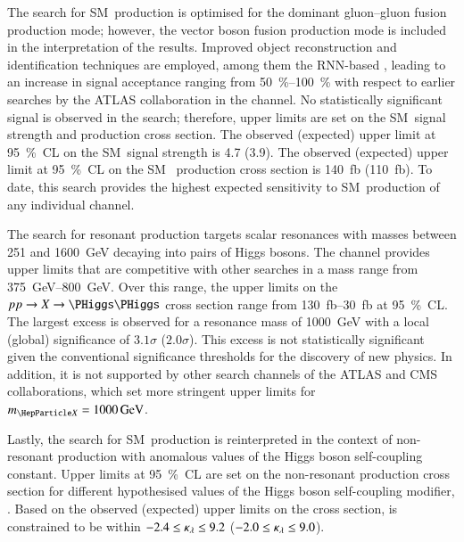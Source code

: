 The search for SM~\HH production is optimised for the dominant gluon--gluon
fusion production mode; however, the vector boson fusion production mode is
included in the interpretation of the results. Improved object reconstruction
and identification techniques are employed, among them the RNN-based \tauid,
leading to an increase in signal acceptance ranging from
\SIrange[range-units=repeat]{50}{100}{\percent} with respect to earlier searches
by the ATLAS collaboration in the \bbtautau channel. No statistically
significant signal is observed in the search; therefore, upper limits are set on
the SM~\HH signal strength and production cross section. The observed (expected)
upper limit at \SI{95}{\percent}~CL on the SM~\HH signal strength is 4.7 (3.9).
The observed (expected) upper limit at \SI{95}{\percent}~CL on the SM~\HH
production cross section is \SI{140}{\femto\barn} (\SI{110}{\femto\barn}). To
date, this search provides the highest expected sensitivity to SM~\HH production
of any individual channel.


The search for resonant \HH production targets scalar resonances with masses
between \num{251} and \SI{1600}{\GeV} decaying into pairs of Higgs bosons. The
\bbtautau channel provides upper limits that are competitive with other searches
in a mass range from \SIrange{375}{800}{\GeV}. Over this range, the upper limits
on the $pp \to X \to \HH$ cross section range from
\SIrange{130}{30}{\femto\barn} at \SI{95}{\percent}~CL. The largest excess is
observed for a resonance mass of \SI{1000}{\GeV} with a local (global)
significance of $3.1\sigma$ ($2.0\sigma$). This excess is not statistically
significant given the conventional significance thresholds for the discovery of
new physics. In addition, it is not supported by other search channels of the
ATLAS and CMS collaborations, which set more stringent upper limits for
$\mX = \SI{1000}{\GeV}$.


Lastly, the search for SM~\HH production is reinterpreted in the context of
non-resonant \HH production with anomalous values of the Higgs boson
self-coupling constant. Upper limits at \SI{95}{\percent}~CL are set on the
non-resonant \HH production cross section for different hypothesised values of
the Higgs boson self-coupling modifier, \klambda. Based on the observed
(expected) upper limits on the cross section, \klambda is constrained to be
within $-2.4 \leq \kappa_{\lambda} \leq 9.2$ ($-2.0 \leq \kappa_{\lambda} \leq 9.0$).


